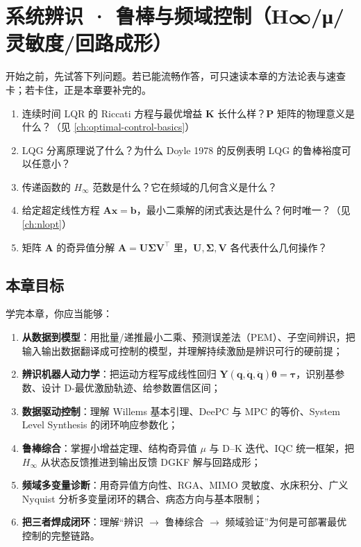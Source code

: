 \chapter{系统辨识 · 鲁棒与频域控制（H∞/μ/灵敏度/回路成形）}
\label{ch:robust-hinf}


\begin{practice}[前置自测]
开始之前，先试答下列问题。若已能流畅作答，可只速读本章的方法论表与速查卡；若卡住，正是本章要补完的。
\begin{enumerate}
  \item 连续时间 LQR 的 Riccati 方程与最优增益 $\mathbf{K}$ 长什么样？$\mathbf{P}$ 矩阵的物理意义是什么？（见 \cref{ch:optimal-control-basics}）
  \item LQG 分离原理说了什么？为什么 Doyle 1978 的反例表明 LQG 的鲁棒裕度可以任意小？
  \item 传递函数的 $H_\infty$ 范数是什么？它在频域的几何含义是什么？
  \item 给定超定线性方程 $\mathbf{A}\mathbf{x}=\mathbf{b}$，最小二乘解的闭式表达是什么？何时唯一？（见 \cref{ch:nlopt}）
  \item 矩阵 $\mathbf{A}$ 的奇异值分解 $\mathbf{A}=\mathbf{U}\boldsymbol\Sigma\mathbf{V}^\top$ 里，$\mathbf{U},\boldsymbol\Sigma,\mathbf{V}$ 各代表什么几何操作？
\end{enumerate}
\end{practice}

\section*{本章目标}
学完本章，你应当能够：
\begin{enumerate}
  \item \textbf{从数据到模型}：用批量/递推最小二乘、预测误差法（PEM）、子空间辨识，把输入输出数据翻译成可控制的模型，并理解持续激励是辨识可行的硬前提；
  \item \textbf{辨识机器人动力学}：把运动方程写成线性回归 $\mathbf{Y}(\mathbf{q},\dot{\mathbf q},\ddot{\mathbf q})\boldsymbol\theta=\boldsymbol\tau$，识别基参数、设计 D-最优激励轨迹、给参数置信区间；
  \item \textbf{数据驱动控制}：理解 Willems 基本引理、DeePC 与 MPC 的等价、System Level Synthesis 的闭环响应参数化；
  \item \textbf{鲁棒综合}：掌握小增益定理、结构奇异值 $\mu$ 与 D--K 迭代、IQC 统一框架，把 $H_\infty$ 从状态反馈推进到输出反馈 DGKF 解与回路成形；
  \item \textbf{频域多变量诊断}：用奇异值方向性、RGA、MIMO 灵敏度、水床积分、广义 Nyquist 分析多变量闭环的耦合、病态方向与基本限制；
  \item \textbf{把三者焊成闭环}：理解“辨识 $\to$ 鲁棒综合 $\to$ 频域验证”为何是可部署最优控制的完整链路。
\end{enumerate}

